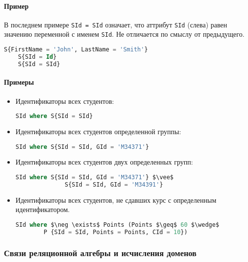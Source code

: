 \paragraph{Пример}

В последнем примере \texttt{SId = SId} означает, что аттрибут \texttt{SId} (слева) равен
значению переменной с именем \texttt{SId}. Не отличается по смыслу от предыдущего.

\begin{lstlisting}[language=SQL]
    S{FirstName = 'John', LastName = 'Smith'}
    S{SId = Id}
    S{SId = SId}
\end{lstlisting}

\paragraph{Примеры}

\begin{itemize}
	\item Идентификаторы всех студентов:
	      \begin{lstlisting}[language=SQL]
    SId where S{SId = SId}
        \end{lstlisting}
	\item Идентификаторы всех студентов определенной группы:
	      \begin{lstlisting}[language=SQL]
    SId where S{SId = SId, GId = 'M34371'}
        \end{lstlisting}
	\item Идентификаторы всех студентов двух определенных групп:
	      \begin{lstlisting}[language=SQL, mathescape=true]
    SId where S{SId = SId, GId = 'M34371'} $\vee$
              S{SId = SId, GId = 'M34391'}
        \end{lstlisting}
	\item Идентификаторы всех студентов, не сдавших курс с определенным идентификатором.
	      \begin{lstlisting}[language=SQL, mathescape=true]
    SId where $\neg \exists$ Points (Points $\geq$ 60 $\wedge$
        P {SId = SId, Points = Points, CId = 10})
        \end{lstlisting}
\end{itemize}

\subsubsection{Связи реляционной алгебры и исчисления доменов}


